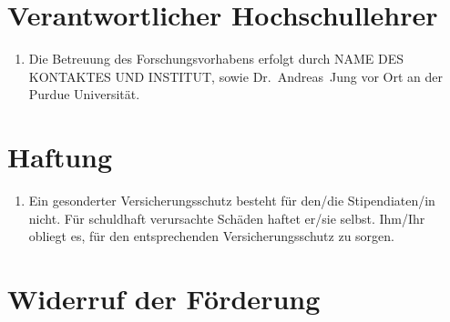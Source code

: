 \documentclass[
  paper=a4,
  fontsize=12pt,
  DIV=16,
  parskip=full,
  headinclude=true,
]{scrartcl}
\newcommand\stipbetreuung{NAME DES KONTAKTES UND INSTITUT}  %
\begin{document}
\section{Verantwortlicher Hochschullehrer}

\begin{enumerate}[\qquad(1)]
  \item Die Betreuung des Forschungsvorhabens erfolgt durch \stipbetreuung,
  sowie Dr.~Andreas~Jung vor Ort an der Purdue Universität.
\end{enumerate}

\section{Haftung}

\begin{enumerate}[\qquad(1)]
  \item Ein gesonderter Versicherungsschutz besteht für den/die
    Stipendiaten/in nicht.
    Für schuldhaft verursachte Schäden haftet er/sie selbst.
    Ihm/Ihr obliegt es, für den entsprechenden Versicherungsschutz
    zu sorgen.
\end{enumerate}

\section{Widerruf der Förderung}
\end{document}

